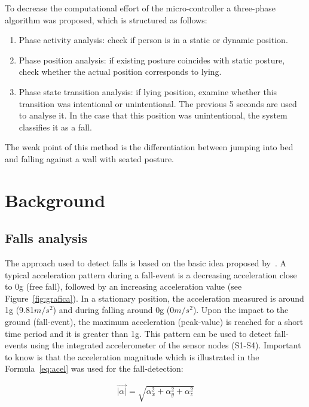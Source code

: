 \documentclass[conference]{IEEEtran}
\theoremstyle{definition}
\begin{document}
To decrease the computational effort of the micro-controller a three-phase algorithm was proposed, which is structured 
as follows:

\begin{enumerate}
 \item Phase activity analysis: check if person is in a static or dynamic position.
 \item Phase position analysis: if existing posture coincides with static posture, check whether the actual position corresponds to lying.
 \item Phase state transition analysis: if lying position, examine whether this transition was intentional or unintentional. The previous 5 
 seconds are used to analyse it. In the case that this position was unintentional, the system classifies it as a fall. 
\end{enumerate}

The weak point of this method is the differentiation between jumping into bed and falling against a wall with seated posture.

\section{Background}
\label{sec:background}

\subsection{Falls analysis}
\label{subsec:analysis}

The approach used to detect falls is based on the basic idea proposed by~\cite{Gjoreski2014,Kozina}. A typical acceleration pattern during 
a fall-event is a decreasing acceleration close to 0g (free fall), followed by an increasing acceleration value (see Figure~\ref{fig:grafica}). In a stationary position, 
the acceleration measured is around 1g (9.81$m/s^{2}$) and during falling around 0g (0$m/s^{2}$). Upon the impact to the ground (fall-event), 
the maximum acceleration (peak-value) is reached for a short time period and it is greater than 1g. This pattern can be used to 
detect fall-events using the integrated accelerometer of the sensor nodes (S1-S4). Important to know is that the acceleration 
magnitude which is illustrated in the Formula~\ref{eq:acel} was used for the fall-detection:

\begin{equation}\label{eq:acel}
 \overrightarrow{\left | \alpha \right |} = \sqrt{\alpha_{x}^{2} + \alpha_{y}^{2} + \alpha_{z}^{2}}
\end{equation}
\end{document}
